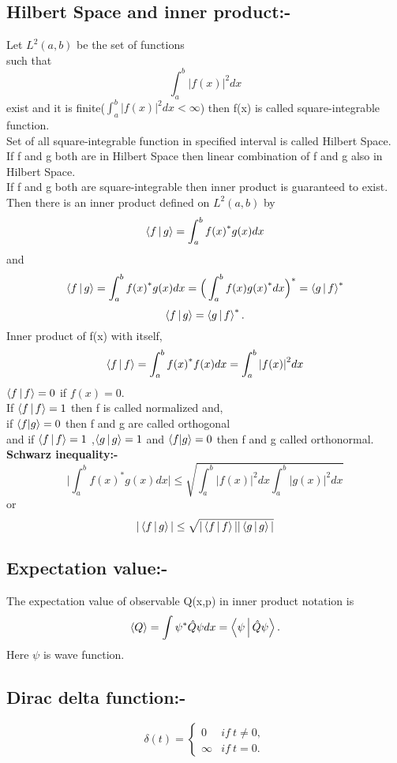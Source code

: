 \subsection{Hilbert Space and inner product:-}
Let $L^{2}(a,b)$ be the set of functions\\
such that $$\int_{a}^{b}{|f(x)|}^2{dx}$$
exist and it is finite\Big($\int_{a}^{b}{|f(x)|}^2{dx}< \infty$\Big) then f(x) is called square-integrable function.\\
Set of all square-integrable function in specified interval is called Hilbert Space.\\
If f and g both are in Hilbert Space then linear combination of f and g also in Hilbert Space.\\
If f and g both are square-integrable then inner product is guaranteed to exist.\\
Then there is an inner product defined on $L^{2}(a,b)$ by
$$\Braket{f|g}=\int_{a}^{b}{f(x)}^{*}{g(x)}{dx}$$
and
$$\Braket{f|g}=\int_{a}^{b}{f(x)}^{*}{g(x)}{dx}=\Big(\int_{a}^{b}{f(x)}{g(x)}^{*}{dx}\Big)^{*}={\Braket{g|f}}^{*}$$
$$\Braket{f|g}=\Braket{g|f}^{*}.$$
Inner product of f(x) with itself,
$$\Braket{f|f}=\int_{a}^{b}{f(x)}^{*}{f(x)}{dx}=\int_{a}^{b}{|f(x)|}^2{dx}$$
$\Braket{f|f}=0$ if $f(x)=0$.\\
If $\Braket{f|f}=1$ then f is called normalized and,\\
if $\braket{f|g}=0$ then f and g are called orthogonal \\ 
 and if $\Braket{f|f}=1$ ,$\Braket{g|g}=1$ and $\braket{f|g}=0$ then f and g called orthonormal. \\
\textbf{ Schwarz inequality:-}\\
$$\Big|\int_{a}^{b}{f(x)}^{*}{g(x)}{dx}\Big|\leq \sqrt{\int_{a}^{b}{|f(x)|}^2{dx}\int_{a}^{b}{|g(x)|}^2{dx}}$$
or$$|\Braket{f|g}|\leq\sqrt{|\Braket{f|f}||\Braket{g|g}|}$$
\subsection{Expectation value:-}
\hspace*{5cm} The expectation value of observable Q(x,p) in inner product notation is 
$$\Braket{Q}=\int {\psi}^{*}\hat{Q}\psi{dx}=\Braket{\psi|\hat{Q}\psi}.$$
Here $\psi$ is wave function.
\subsection{Dirac delta function:-}
$$\delta(t)=\begin{cases}
0 &{if~t\neq{0},}\\
{\infty} &{if~t=0.}
\end{cases}$$

